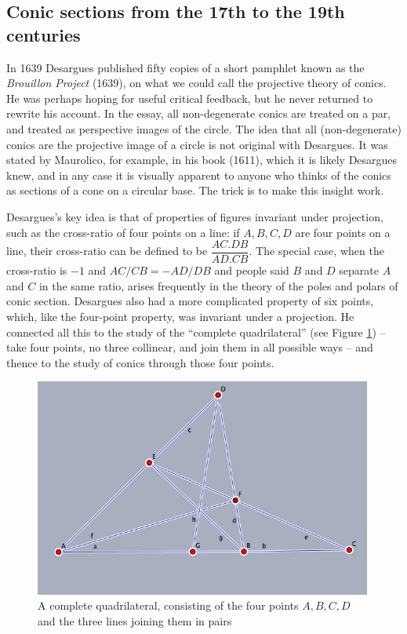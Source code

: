 \subsection{Conic sections from the 17th to the 19th centuries}
In 1639 Desargues published fifty copies of a short pamphlet known as the \emph{Brouillon Project} (1639), on what we could call the projective theory of conics. He was perhaps hoping for useful critical feedback, but he never returned to rewrite his account.  In the essay, all non-degenerate conics are treated on a par, and treated as perspective images of the circle. The idea that all (non-degenerate) conics are the projective image of a circle is not original with Desargues. It was stated by Maurolico, for example, in his book  (1611), which it is likely Desargues knew, and in any case it is visually apparent to anyone who thinks of the conics as sections of a cone on a circular base. The trick is to make this insight work.

Desargues's key idea is that of properties of figures invariant under projection, such as the cross-ratio of four points on a line: if $A,  B, C, D$ are four points on a line, their cross-ratio can be defined to be
$\dfrac{AC.DB}{AD.CB}$. The special case,  when the cross-ratio is $-1$ and $AC/CB=-AD/DB$ and people said $B$ and $D$ separate $A$ and $C$ in the same ratio, arises frequently in the theory of the poles and polars of conic section. Desargues also had a more complicated property of six points, which, like the four-point property, was invariant under a projection. He connected all this to the study of the ``complete quadrilateral'' (see Figure \ref{figCompleteQuad}) -- take four points, no three collinear, and join them in all possible ways --  and thence to the study of conics through those four points. 

\bigskip
\begin{center}
    \begin{figure}
   \begin{center}  \includegraphics[width=30em]{CompleteQuad3.png} 
   \end{center}
     \protect \caption{A complete quadrilateral, consisting of the four points $A, B, C, D$ and the three lines joining them in pairs}
      \label{figCompleteQuad}
     \end{figure}
\end{center}

